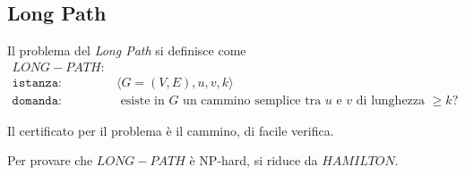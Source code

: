 \subsection{Long Path}
Il problema del \emph{Long Path} si definisce come
\begin{align*}
    LONG-PATH: & \\
    \texttt{istanza:} \quad &
    \langle
    G = (V,E), u, v, k
    \rangle
    \\
    \texttt{domanda:} \quad &
    \text{ esiste in $G$ un cammino semplice tra $u$ e $v$ di lunghezza $\geq k$?}
\end{align*}

Il certificato per il problema è il cammino, di facile verifica.

Per provare che $LONG-PATH$ è NP-hard, si riduce da $HAMILTON$.

